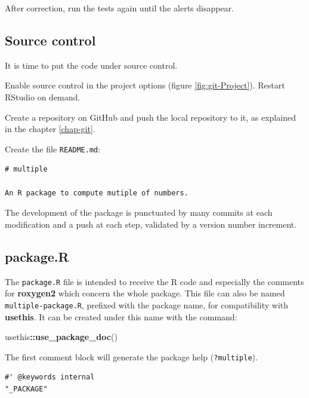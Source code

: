 \documentclass[
  12pt,
  american,
  a4paper,
  extrafontsizes,onecolumn,openright
  ]{memoir}
\newenvironment{Shaded}{\begin{snugshade}}{\end{snugshade}}
\newcommand{\FunctionTok}[1]{\textcolor[rgb]{0.13,0.29,0.53}{\textbf{#1}}}
\newcommand{\NormalTok}[1]{#1}
\newcommand{\SpecialCharTok}[1]{\textcolor[rgb]{0.81,0.36,0.00}{\textbf{#1}}}
\begin{document}
After correction, run the tests again until the alerts disappear.

\subsection{Source control}\label{sec:package-cds}

It is time to put the code under source control.

Enable source control in the project options (figure \ref{fig:git-Project}).
Restart RStudio on demand.

Create a repository on GitHub and push the local repository to it, as explained in the chapter \ref{chap-git}.

Create the file \texttt{README.md}:

\begin{verbatim}
# multiple

An R package to compute mutiple of numbers.
\end{verbatim}

The development of the package is punctuated by many commits at each modification and a push at each step, validated by a version number increment.

\subsection{package.R}\label{package.r}

The \texttt{package.R} file is intended to receive the R code and especially the comments for \textbf{roxygen2} which concern the whole package.
This file can also be named \texttt{multiple-package.R}, prefixed with the package name, for compatibility with \textbf{usethis}.
It can be created under this name with the command:

\scriptsize

\begin{Shaded}
\begin{Highlighting}[]
\NormalTok{usethis}\SpecialCharTok{::}\FunctionTok{use\_package\_doc}\NormalTok{()}
\end{Highlighting}
\end{Shaded}

\normalsize

The first comment block will generate the package help (\texttt{?multiple}).

\begin{verbatim}
#' @keywords internal 
"_PACKAGE"
\end{verbatim}
\end{document}
